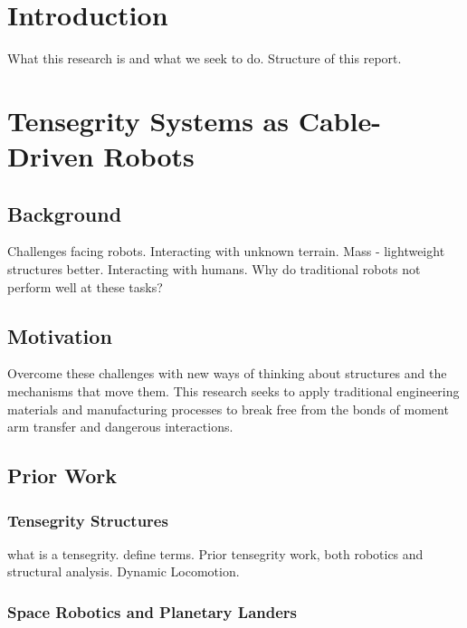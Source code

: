 \documentclass[12pt]{report}
\begin{document}

\chapter{Introduction}

What this research is and what we seek to do. 
Structure of this report.



\chapter{Tensegrity Systems as Cable-Driven Robots}

\section{Background}
Challenges facing robots.
Interacting with unknown terrain.
Mass - lightweight structures better.
Interacting with humans.
Why do traditional robots not perform well at these tasks?

\section{Motivation}
Overcome these challenges with new ways of thinking about structures and the mechanisms that move them.
This research seeks to apply traditional engineering materials and manufacturing processes to break free from the bonds of moment arm transfer and dangerous interactions.

\section{Prior Work}

\subsection{Tensegrity Structures}

what is a tensegrity. 
define terms. 
Prior tensegrity work, both robotics and structural analysis.
Dynamic Locomotion.

\subsection{Space Robotics and Planetary Landers}
\end{document}
